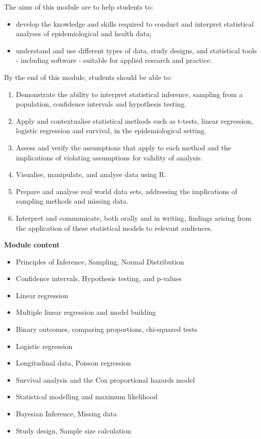 \documentclass[
]{book}
\providecommand{\tightlist}{%
  \setlength{\itemsep}{0pt}\setlength{\parskip}{0pt}}
\begin{document}
The aims of this module are to help students to:

\begin{itemize}
\tightlist
\item
  develop the knowledge and skills required to conduct and interpret statistical analyses of epidemiological and health data;
\item
  understand and use different types of data, study designs, and statistical tools - including software - suitable for applied research and practice.
\end{itemize}

By the end of this module, students should be able to:

\begin{enumerate}
\def\labelenumi{\arabic{enumi}.}
\tightlist
\item
  Demonstrate the ability to interpret statistical inference, sampling from a population, confidence intervals and hypothesis testing.
\item
  Apply and contextualise statistical methods such as t-tests, linear regression, logistic regression and survival, in the epidemiological setting.
\item
  Assess and verify the assumptions that apply to each method and the implications of violating assumptions for validity of analysis.
\item
  Visualise, manipulate, and analyse data using R.
\item
  Prepare and analyse real world data sets, addressing the implications of sampling methods and missing data.
\item
  Interpret and communicate, both orally and in writing, findings arising from the application of these statistical models to relevant audiences.
\end{enumerate}

\textbf{Module content}

\begin{itemize}
\tightlist
\item
  Principles of Inference, Sampling, Normal Distribution
\item
  Confidence intervals, Hypothesis testing, and p-values
\item
  Linear regression
\item
  Multiple linear regression and model building
\item
  Binary outcomes, comparing proportions, chi-squared tests
\item
  Logistic regression
\item
  Longitudinal data, Poisson regression
\item
  Survival analysis and the Cox proportional hazards model
\item
  Statistical modelling and maximum likelihood
\item
  Bayesian Inference, Missing data
\item
  Study design, Sample size calculation
\end{itemize}
\end{document}
